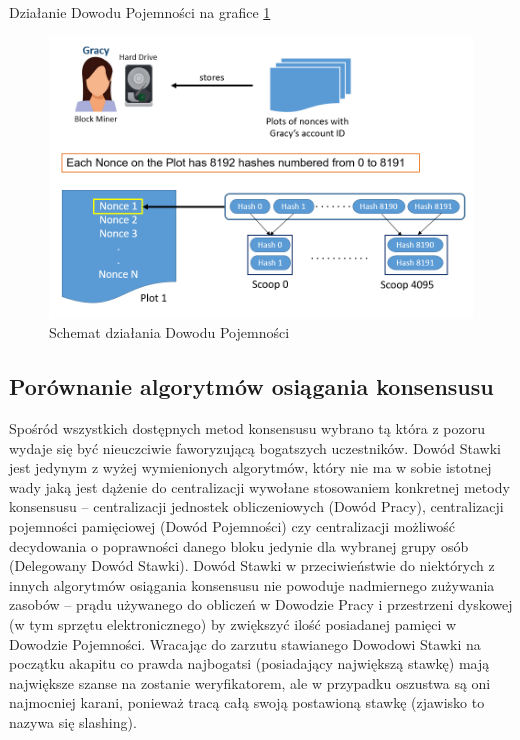 \vspace{0.3\baselineskip}

Działanie Dowodu Pojemności na grafice \ref{fig:ConsensusPOC}
\begin{figure}[H]
    \centering
    \includegraphics[width=\textwidth]{Images/ConsensusPOC.png}
    \caption{Schemat działania Dowodu Pojemności}
    \label{fig:ConsensusPOC}
\end{figure}

\subsection{Porównanie algorytmów osiągania konsensusu}
Spośród wszystkich dostępnych metod konsensusu wybrano tą która z pozoru wydaje się być nieuczciwie faworyzującą bogatszych uczestników. Dowód Stawki jest jedynym z wyżej wymienionych algorytmów, który nie ma w sobie istotnej wady jaką jest dążenie do centralizacji wywołane stosowaniem konkretnej metody konsensusu – centralizacji jednostek obliczeniowych (Dowód Pracy), centralizacji pojemności pamięciowej (Dowód Pojemności) czy centralizacji możliwość decydowania o poprawności danego bloku jedynie dla wybranej grupy osób (Delegowany Dowód Stawki). Dowód Stawki w przeciwieństwie do niektórych z innych algorytmów osiągania  konsensusu nie powoduje nadmiernego zużywania zasobów – prądu używanego do obliczeń w Dowodzie Pracy i przestrzeni dyskowej (w tym sprzętu elektronicznego) by zwiększyć ilość posiadanej pamięci w Dowodzie Pojemności. Wracając do zarzutu stawianego Dowodowi Stawki na początku akapitu co prawda najbogatsi (posiadający największą stawkę) mają największe szanse na zostanie weryfikatorem, ale w przypadku oszustwa są oni najmocniej karani, ponieważ tracą całą swoją postawioną stawkę (zjawisko to nazywa się slashing).

